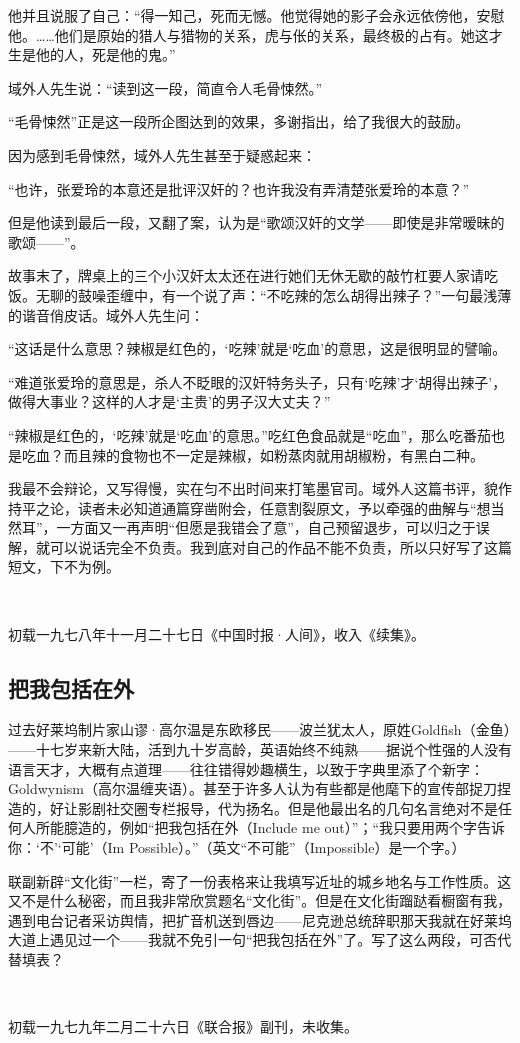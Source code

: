 \par 他并且说服了自己：“得一知己，死而无憾。他觉得她的影子会永远依傍他，安慰他。……他们是原始的猎人与猎物的关系，虎与伥的关系，最终极的占有。她这才生是他的人，死是他的鬼。”
\par 域外人先生说：“读到这一段，简直令人毛骨悚然。”
\par “毛骨悚然”正是这一段所企图达到的效果，多谢指出，给了我很大的鼓励。
\par 因为感到毛骨悚然，域外人先生甚至于疑惑起来：
\par “也许，张爱玲的本意还是批评汉奸的？也许我没有弄清楚张爱玲的本意？”
\par 但是他读到最后一段，又翻了案，认为是“歌颂汉奸的文学——即使是非常暧昧的歌颂——”。
\par 故事末了，牌桌上的三个小汉奸太太还在进行她们无休无歇的敲竹杠要人家请吃饭。无聊的鼓噪歪缠中，有一个说了声：“不吃辣的怎么胡得出辣子？”一句最浅薄的谐音俏皮话。域外人先生问：
\par “这话是什么意思？辣椒是红色的，‘吃辣’就是‘吃血’的意思，这是很明显的譬喻。
\par “难道张爱玲的意思是，杀人不眨眼的汉奸特务头子，只有‘吃辣’才‘胡得出辣子’，做得大事业？这样的人才是‘主贵’的男子汉大丈夫？”
\par “辣椒是红色的，‘吃辣’就是‘吃血’的意思。”吃红色食品就是“吃血”，那么吃番茄也是吃血？而且辣的食物也不一定是辣椒，如粉蒸肉就用胡椒粉，有黑白二种。
\par 我最不会辩论，又写得慢，实在匀不出时间来打笔墨官司。域外人这篇书评，貌作持平之论，读者未必知道通篇穿凿附会，任意割裂原文，予以牵强的曲解与“想当然耳”，一方面又一再声明“但愿是我错会了意”，自己预留退步，可以归之于误解，就可以说话完全不负责。我到底对自己的作品不能不负责，所以只好写了这篇短文，下不为例。
\par  
\par *初载一九七八年十一月二十七日《中国时报·人间》，收入《续集》。




\subsection{把我包括在外}


\par 过去好莱坞制片家山谬·高尔温是东欧移民——波兰犹太人，原姓Goldfish（金鱼）——十七岁来新大陆，活到九十岁高龄，英语始终不纯熟——据说个性强的人没有语言天才，大概有点道理——往往错得妙趣横生，以致于字典里添了个新字：Goldwynism（高尔温缠夹语）。甚至于许多人认为有些都是他麾下的宣传部捉刀捏造的，好让影剧社交圈专栏报导，代为扬名。但是他最出名的几句名言绝对不是任何人所能臆造的，例如“把我包括在外（Include me out）”；“我只要用两个字告诉你：‘不’‘可能’（Im Possible）。”（英文“不可能”（Impossible）是一个字。）
\par 联副新辟“文化街”一栏，寄了一份表格来让我填写近址的城乡地名与工作性质。这又不是什么秘密，而且我非常欣赏题名“文化街”。但是在文化街蹓跶看橱窗有我，遇到电台记者采访舆情，把扩音机送到唇边——尼克逊总统辞职那天我就在好莱坞大道上遇见过一个——我就不免引一句“把我包括在外”了。写了这么两段，可否代替填表？
\par  
\par *初载一九七九年二月二十六日《联合报》副刊，未收集。



